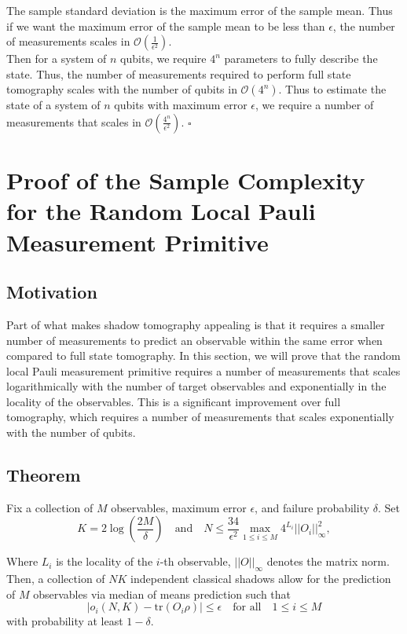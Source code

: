 \documentclass[12pt]{article}
\begin{document}
    The sample standard deviation is the maximum error of the sample mean. Thus if we want the maximum error of the sample mean to be less than $\epsilon$, the number of measurements scales in $\mathcal{O}\left( \frac{1}{\epsilon^2} \right)$.\\
    Then for a system of $n$ qubits, we require $4^n$ parameters to fully describe the state. Thus, the number of measurements required to perform full state tomography scales with the number of qubits in $\mathcal{O}\left( 4^n \right)$. Thus to estimate the state of a system of $n$ qubits with maximum error $\epsilon$, we require a number of measurements that scales in $\mathcal{O}\left( \frac{4^n}{\epsilon^2} \right)$.
    \hfill $\square$


    \section{Proof of the Sample Complexity for the Random Local Pauli Measurement Primitive}
    \subsection{Motivation}
    Part of what makes shadow tomography appealing is that it requires a smaller number of measurements to predict an observable within the same error when compared to full state tomography. In this section, we will prove that the random local Pauli measurement primitive requires a number of measurements that scales logarithmically with the number of target observables and exponentially in the locality of the observables. This is a significant improvement over full tomography, which requires a number of measurements that scales exponentially with the number of qubits. 

    \subsection{Theorem}
    Fix a collection of $M$ observables, maximum error $\epsilon$, and failure probability $\delta$. Set 
    \begin{equation*}
        K = 2 \log{\left(\frac{2M}{\delta}\right)} \quad \text{and} \quad N \leq \frac{34}{\epsilon^2} \max_{1 \leq i \leq M} 4^{L_i} ||O_i||^2_\infty,
    \end{equation*}

    Where $L_i$ is the locality of the $i$-th observable, $||O||_\infty$ denotes the matrix norm. Then, a collection of $NK$ independent classical shadows allow for the prediction of $M$ observables via median of means prediction such that
    \begin{equation*}
        |\hat{o}_i(N,K) - \text{tr}(O_i\rho)| \leq \epsilon \quad \text{for all} \quad 1 \leq i \leq M
    \end{equation*}
    with probability at least $1-\delta$.
\end{document}
